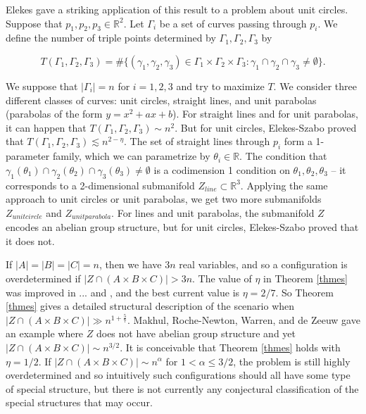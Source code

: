 \documentclass{amsart}
\newcommand{\RR}{\mathbb{R}}
\begin{document}
Elekes gave a striking application of this result to a problem about unit circles.  Suppose that $p_1, p_2, p_3 \in \RR^2$.  Let $\Gamma_i$ be a set of curves passing through $p_i$.  We define the number of triple points determined by $\Gamma_1, \Gamma_2, \Gamma_3$ by

\begin{equation} \label{deftrip}
T(\Gamma_1, \Gamma_2, \Gamma_3) = \# \{ (\gamma_1, \gamma_2, \gamma_3) \in \Gamma_1 \times \Gamma_2 \times \Gamma_3: \gamma_1 \cap \gamma_2 \cap \gamma_3 \not= \emptyset \}. 
\end{equation}

\noindent We suppose that $|\Gamma_i| = n$ for $i = 1,2,3$ and try to maximize $T$.  We consider three different classes of curves: unit circles, straight lines, and unit parabolas (parabolas of the form $y = x^2 + a x + b$).  For straight lines and for unit parabolas, it can happen that $T(\Gamma_1, \Gamma_2, \Gamma_3) \sim n^2$.  But for unit circles, Elekes-Szabo proved that 
$T(\Gamma_1, \Gamma_2, \Gamma_3) \lesssim n^{2 - \eta}$.  The set of straight lines through $p_i$ form a 1-parameter family, which we can parametrize by $\theta_i \in \RR$.  The condition that $\gamma_1(\theta_1) \cap \gamma_2(\theta_2) \cap \gamma_3(\theta_3) \not= \emptyset$ is a codimension 1 condition on $\theta_1, \theta_2, \theta_3$ -- it corresponds to a 2-dimensional submanifold $Z_{line} \subset \RR^3$.  Applying the same approach to unit circles or unit parabolas, we get two more submanifolds $Z_{unit circle}$ and $Z_{unit parabola}$.  For lines and unit parabolas, the submanifold $Z$ encodes an abelian group structure, but for unit circles, Elekes-Szabo proved that it does not.

 If $|A| = |B| = |C| = n$, then we have $3n$ real variables, and so a configuration is overdetermined if $|Z \cap (A \times B \times C)| > 3n$.  The value of $\eta$ in Theorem \ref{thmes} was improved in ... and \cite{SZ}, and the best current value is $\eta = 2/7$.  So Theorem \ref{thmes} gives a detailed structural description of the scenario when $|Z \cap (A \times B \times C)| \gg n^{1 + \frac{5}{7}}$.  
Makhul,  Roche-Newton, Warren, and de Zeeuw \cite{MRWZ} gave an example where $Z$ does not have abelian group structure and yet $|Z \cap (A \times B \times C)| \sim n^{3/2}$.  It is conceivable that Theorem \ref{thmes} holds with $\eta = 1/2$.  If $|Z \cap (A \times B \times C)| \sim n^\alpha$ for $1 <\alpha \le 3/2$, the problem is still highly overdetermined and so intuitively such configurations should all have some type of special structure, but there is not currently any conjectural classification of the special structures that may occur.
\end{document}
